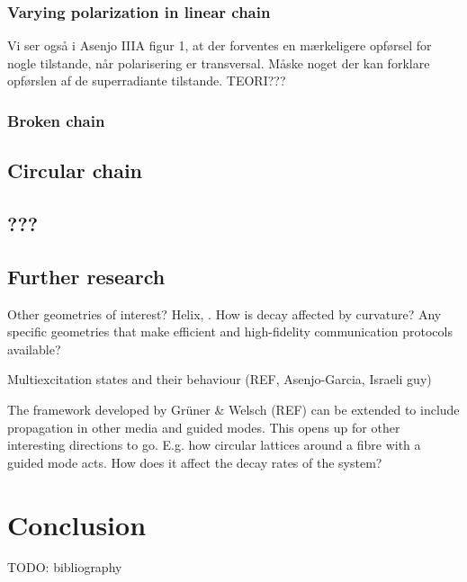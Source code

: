 \documentclass{article}
\begin{document}
\subsubsection{Varying polarization in linear chain}

Vi ser også i Asenjo IIIA figur 1, at der forventes en mærkeligere opførsel for nogle tilstande, når polarisering er transversal. Måske noget der kan forklare opførslen af de superradiante tilstande. TEORI???

\subsubsection{Broken chain}

\subsection{Circular chain}

\subsection{???}

\subsection{Further research} \label{sec:further}

Other geometries of interest? Helix, . How is decay affected by curvature?
Any specific geometries that make efficient and high-fidelity communication protocols available?

Multiexcitation states and their behaviour (REF, Asenjo-Garcia, Israeli guy)

The framework developed by Grüner \& Welsch (REF) can be extended to include propagation in other media and guided modes. This opens up for other interesting directions to go. E.g. how circular lattices around a fibre with a guided mode acts. How does it affect the decay rates of the system? 

\section{Conclusion}

\newpage
TODO: bibliography
\end{document}
